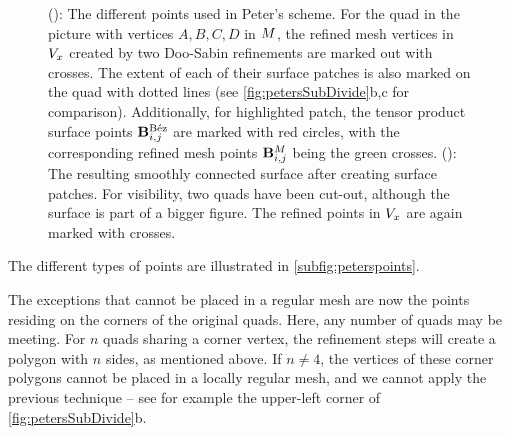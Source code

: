 \begin{figure}
\begin{center}
\begin{subfigure}{.45\textwidth}
\begin{center}
\label{subfig:smoothsurf}
\end{center}
\end{subfigure}
\caption{(): The different points used in Peter's scheme. For the quad in the picture with vertices $A,B,C,D$ in $\petersControlMesh$, the refined mesh vertices in $\petersPatchPoints$ created by two Doo-Sabin refinements are marked out with crosses. The extent of each of their \Bez surface patches is also marked on the quad with dotted lines (see \autoref{fig:petersSubDivide}b,c for comparison). Additionally, for highlighted patch, the tensor product \Bez surface points $\petersLocalBezPointIndices{i,j}$ are marked with red circles, with the corresponding refined mesh points $\petersLocalPatchPointIndices{i,j}$ being the green crosses. (): The resulting smoothly connected surface after creating \Bez surface patches. For visibility, two quads have been cut-out, although the surface is part of a bigger figure. The refined points in $\petersPatchPoints$ are again marked with crosses.}
\label{fig:petersDiags}
\end{center}
\end{figure}

The different types of points are illustrated in \autoref{subfig:peterspoints}.


%

The exceptions that cannot be placed in a regular mesh are now the points residing on the corners of the original quads. 
Here, any number of quads may be meeting.
 For $n$ quads sharing a corner vertex, the refinement steps will create a polygon with $n$ sides, as mentioned above. If $n\neq4$, the vertices of these corner polygons cannot be placed in a locally regular mesh, and we cannot apply the previous technique -- see for example the upper-left corner of \autoref{fig:petersSubDivide}b.

